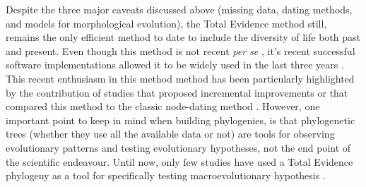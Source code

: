 
Despite the three major caveats discussed above (missing data, dating methods, and models for morphological evolution), the Total Evidence method still, remains the only efficient method to date to include the diversity of life both past and present.
Even though this method is not recent \textit{per se} \citep[e.g.][]{eernissetaxonomic1993}, it's recent successful software implementations \citep{Ronquist2012mrbayes,BEAST2} allowed it to be widely used in the last three years \citep{ronquista2012,Slater2012MEE,Wood01032013,schragocombining2013,beckancient2014,Arcila2015131,Dembo2015,Klopfstein12082015,Carrizo,Wittenberg2015TEM,gavryushkina2015bayesian}.
This recent enthusiasm in this method method has been particularly highlighted by the contribution of studies that proposed incremental improvements \citep{Klopfstein12082015,gavryushkina2015bayesian} or that compared this method to the classic node-dating method \citep{ronquista2012,Arcila2015131}.
However, one important point to keep in mind when building phylogenies, is that phylogenetic trees (whether they use all the available data or not) are tools for observing evolutionary patterns and testing evolutionary hypotheses, not the end point of the scientific endeavour.
Until now, only few studies have used a Total Evidence phylogeny as a tool for specifically testing macroevolutionary hypothesis \citep[e.g.][]{Slater2012MEE,Wood01032013,Dembo2015}.

